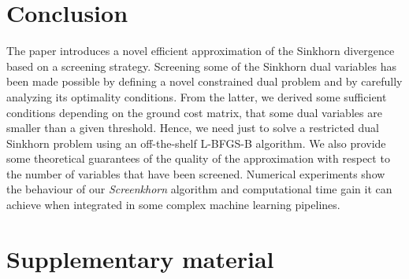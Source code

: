 \documentclass{article}
\begin{document}
\section{Conclusion}
The paper introduces a novel efficient approximation of the Sinkhorn divergence
based on a screening strategy. Screening some of the Sinkhorn dual variables
has been made possible by defining a novel constrained dual problem and by 
carefully analyzing its optimality conditions. From the latter, we derived some
sufficient conditions depending on the ground cost matrix, that some dual variables are smaller than a given threshold. Hence, we need just to solve a restricted
dual Sinkhorn problem using an off-the-shelf L-BFGS-B algorithm. We also provide
some theoretical guarantees of the quality of the approximation with respect to
the number of variables that have been screened. Numerical experiments show 
the behaviour of our \emph{Screenkhorn} algorithm and computational time gain it can
achieve when integrated in some complex machine learning pipelines.



\small



\newpage
\section{Supplementary material}

\end{document}
